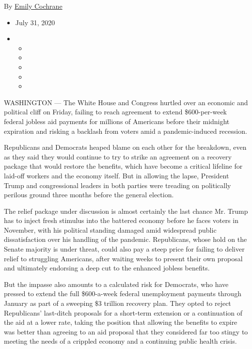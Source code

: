 By \href{https://www.nytimes.com/by/emily-cochrane}{Emily Cochrane}

\begin{itemize}
\item
  July 31, 2020
\item
  \begin{itemize}
  \item
  \item
  \item
  \item
  \item
  \end{itemize}
\end{itemize}

WASHINGTON --- The White House and Congress hurtled over an economic and
political cliff on Friday, failing to reach agreement to extend
\$600-per-week federal jobless aid payments for millions of Americans
before their midnight expiration and risking a backlash from voters amid
a pandemic-induced recession.

Republicans and Democrats heaped blame on each other for the breakdown,
even as they said they would continue to try to strike an agreement on a
recovery package that would restore the benefits, which have become a
critical lifeline for laid-off workers and the economy itself. But in
allowing the lapse, President Trump and congressional leaders in both
parties were treading on politically perilous ground three months before
the general election.

The relief package under discussion is almost certainly the last chance
Mr. Trump has to inject fresh stimulus into the battered economy before
he faces voters in November, with his political standing damaged amid
widespread public dissatisfaction over his handling of the pandemic.
Republicans, whose hold on the Senate majority is under threat, could
also pay a steep price for failing to deliver relief to struggling
Americans, after waiting weeks to present their own proposal and
ultimately endorsing a deep cut to the enhanced jobless benefits.

But the impasse also amounts to a calculated risk for Democrats, who
have pressed to extend the full \$600-a-week federal unemployment
payments through January as part of a sweeping \$3 trillion recovery
plan. They opted to reject Republicans' last-ditch proposals for a
short-term extension or a continuation of the aid at a lower rate,
taking the position that allowing the benefits to expire was better than
agreeing to an aid proposal that they considered far too stingy to
meeting the needs of a crippled economy and a continuing public health
crisis.

